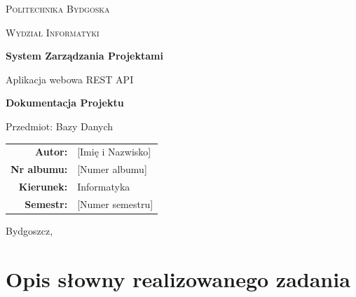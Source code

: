 \documentclass[12pt,a4paper]{report}
\begin{document}
\begin{titlepage}
    \centering
    \vspace*{2cm}
    
    {\scshape\LARGE Politechnika Bydgoska \par}
    \vspace{0.5cm}
    {\scshape\Large Wydział Informatyki \par}
    \vspace{2cm}
    
    {\huge\bfseries System Zarządzania Projektami\par}
    \vspace{0.5cm}
    {\Large Aplikacja webowa REST API\par}
    \vspace{2cm}
    
    {\Large\bfseries Dokumentacja Projektu\par}
    \vspace{1cm}
    
    {\large Przedmiot: Bazy Danych\par}
    \vspace{2cm}
    
    \begin{tabular}{rl}
        \textbf{Autor:} & [Imię i Nazwisko] \\
        \textbf{Nr albumu:} & [Numer albumu] \\
        \textbf{Kierunek:} & Informatyka \\
        \textbf{Semestr:} & [Numer semestru] \\
    \end{tabular}
    
    \vfill
    
    {\large Bydgoszcz, \the\year\par}
\end{titlepage}

\tableofcontents
\newpage

\chapter{Opis słowny realizowanego zadania}
\end{document}
